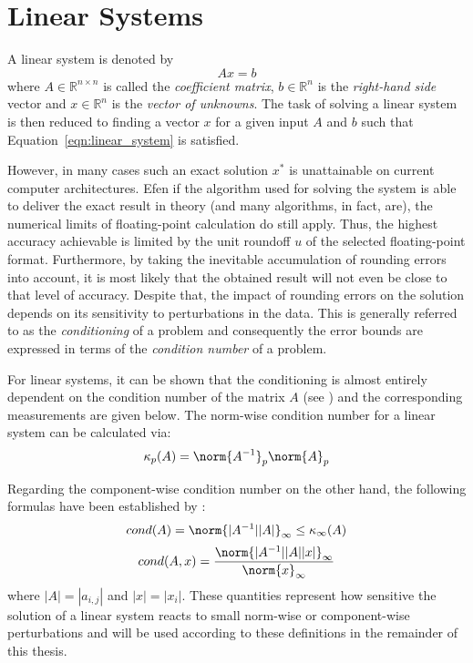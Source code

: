 \section{Linear Systems}
\label{sec:linear_systems}

\noindent A linear system is denoted by
\begin{equation}
\label{eqn:linear_system}
    Ax=b
\end{equation}
\noindent where $A \in \mathbb{R}^{n \times n}$ is called the \textit{coefficient matrix}, $b \in \mathbb{R}^{n}$ is the \textit{right-hand side} vector and $x \in \mathbb{R}^{n}$ is the \textit{vector of unknowns}. The task of solving a linear system is then reduced to finding a vector $x$ for a given input $A$ and $b$ such that Equation~\hyperref[eqn:linear_system]{\ref{eqn:linear_system}} is satisfied.

However, in many cases such an exact solution $x^*$ is unattainable on current computer architectures. Efen if the algorithm used for solving the system is able to deliver the exact result in theory (and many algorithms, in fact, are), the numerical limits of floating-point calculation do still apply. Thus, the highest accuracy achievable is limited by the unit roundoff $u$ of the selected floating-point format. Furthermore, by taking the inevitable accumulation of rounding errors into account, it is most likely that the obtained result will not even be close to that level of accuracy. Despite that, the impact of rounding errors on the solution depends on its sensitivity to perturbations in the data. This is generally referred to as the \textit{conditioning} of a problem and consequently the error bounds are expressed in terms of the \textit{condition number} of a problem.

For linear systems, it can be shown that the conditioning is almost entirely dependent on the condition number of the matrix $A$ (see \cite{higham_accuracy_2002}) and the corresponding measurements are given below. The norm-wise condition number for a linear system can be calculated via:
\begin{equation}
\kappa_{p}(A) = \norm{A^{-1}}_p\norm{A}_p
\end{equation}

\noindent Regarding the component-wise condition number on the other hand, the following formulas have been established by \cite{skeel_scaling_1979}:
\begin{equation}
cond(A) = \norm{|A^{-1}||A|}_\infty \leq \kappa_{\infty}(A)
\end{equation}
\begin{equation}
cond(A,x) = \frac{\norm{|A^{-1}||A||x|}_\infty}{\norm{x}_\infty}
\end{equation}
\noindent where $|A| = |a_{i,j}|$ and $|x| = |x_{i}|$. These quantities represent how sensitive the solution of a linear system reacts to small norm-wise or component-wise perturbations and will be used according to these definitions in the remainder of this thesis.
